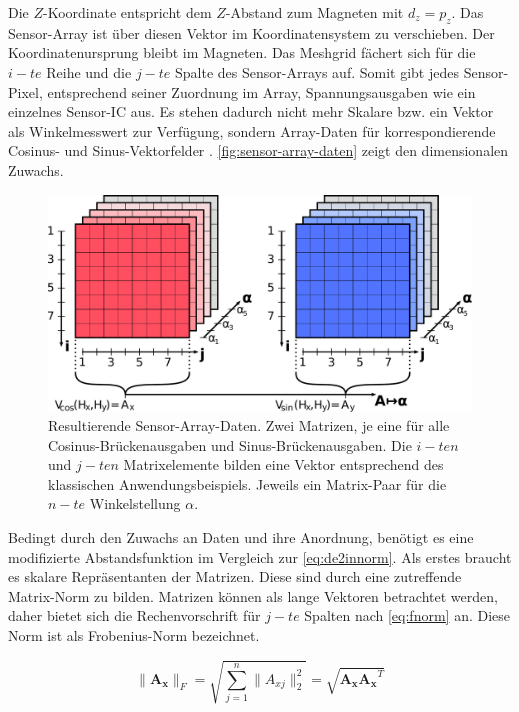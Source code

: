 Die  $Z$-Koordinate entspricht dem $Z$-Abstand zum Magneten mit $d_z = p_z$. Das Sensor-Array ist über diesen Vektor im Koordinatensystem zu verschieben. Der Koordinatenursprung bleibt im Magneten. Das Meshgrid fächert sich für die $i-te$ Reihe und die $j-te$ Spalte des Sensor-Arrays auf. Somit gibt jedes Sensor-Pixel, entsprechend seiner Zuordnung im Array, Spannungsausgaben wie ein einzelnes Sensor-IC aus. Es stehen dadurch nicht mehr Skalare bzw. ein Vektor als Winkelmesswert zur Verfügung, sondern Array-Daten für korrespondierende Cosinus- und Sinus-Vektorfelder \cite{Mehm2019}\cite{Schuethe2020}. \autoref{fig:sensor-array-daten} zeigt den dimensionalen Zuwachs. 


\vspace{5mm}
\begin{figure}[tph]
	\centering
	\includegraphics[width=0.9\linewidth]{chapters/images/2-Grundlagen/Sensor-Array-Daten}
	\caption[Resultierende Sensor-Array-Daten]{Resultierende Sensor-Array-Daten. Zwei Matrizen, je eine für alle Cosinus-Brückenausgaben und Sinus-Brückenausgaben. Die $i-ten$ und $j-ten$ Matrixelemente bilden eine Vektor entsprechend des klassischen Anwendungsbeispiels. Jeweils ein Matrix-Paar für die $n-te$ Winkelstellung $\alpha$.}
	\label{fig:sensor-array-daten}
\end{figure}


Bedingt durch den Zuwachs an Daten und ihre Anordnung, benötigt es eine modifizierte Abstandsfunktion \cite{Schuethe2020b}\cite{Schuethe2020} im Vergleich zur \autoref{eq:de2innorm}. Als erstes braucht es skalare Repräsentanten der Matrizen. Diese sind durch eine zutreffende Matrix-Norm zu bilden. Matrizen können als lange Vektoren betrachtet werden, daher bietet sich die Rechenvorschrift für $j-te$ Spalten nach \autoref{eq:fnorm} an. Diese Norm ist als Frobenius-Norm bezeichnet.


\begin{equation}\label{eq:fnorm}
\|\mathbf{A_x}\|_F= \sqrt{\sum_{j=1}^{n}\|A_{xj}\|_2^2} = \sqrt{\mathbf{A_x}\mathbf{A_x}^T}
\end{equation}


